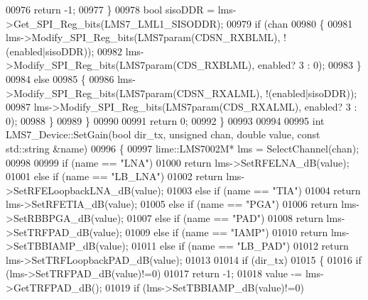 \begin{DoxyCode}
{{{00976                 \textcolor{keywordflow}{return} -1;
00977         \}
00978         \textcolor{keywordtype}{bool} sisoDDR = lms->Get_SPI_Reg_bits(LMS7_LML1_SISODDR);
00979         \textcolor{keywordflow}{if} (chan%
00980         \{
00981             lms->Modify_SPI_Reg_bits(LMS7param(CDSN_RXBLML), !(enabled|sisoDDR));
00982             lms->Modify_SPI_Reg_bits(LMS7param(CDS_RXBLML), enabled? 3 : 0);
00983         \}
00984         \textcolor{keywordflow}{else}
00985         \{
00986             lms->Modify_SPI_Reg_bits(LMS7param(CDSN_RXALML), !(enabled|sisoDDR));
00987             lms->Modify_SPI_Reg_bits(LMS7param(CDS_RXALML),  enabled? 3 : 0);
00988         \}
00989     \}
00990 
00991    \textcolor{keywordflow}{return} 0;
00992 \}
00993 
00994 
00995 \textcolor{keywordtype}{int} LMS7_Device::SetGain(\textcolor{keywordtype}{bool} dir_tx, \textcolor{keywordtype}{unsigned} chan, \textcolor{keywordtype}{double} value, \textcolor{keyword}{const} 
      std::string &name)
00996 \{
00997     lime::LMS7002M* lms = SelectChannel(chan);
00998 
00999     \textcolor{keywordflow}{if} (name == \textcolor{stringliteral}{"LNA"})
01000         \textcolor{keywordflow}{return} lms->SetRFELNA_dB(value);
01001     \textcolor{keywordflow}{else} \textcolor{keywordflow}{if} (name == \textcolor{stringliteral}{"LB\_LNA"})
01002         \textcolor{keywordflow}{return} lms->SetRFELoopbackLNA_dB(value);
01003     \textcolor{keywordflow}{else} \textcolor{keywordflow}{if} (name == \textcolor{stringliteral}{"TIA"})
01004         \textcolor{keywordflow}{return} lms->SetRFETIA_dB(value);
01005     \textcolor{keywordflow}{else} \textcolor{keywordflow}{if} (name == \textcolor{stringliteral}{"PGA"})
01006         \textcolor{keywordflow}{return} lms->SetRBBPGA_dB(value);
01007     \textcolor{keywordflow}{else} \textcolor{keywordflow}{if} (name == \textcolor{stringliteral}{"PAD"})
01008         \textcolor{keywordflow}{return} lms->SetTRFPAD_dB(value);
01009     \textcolor{keywordflow}{else} \textcolor{keywordflow}{if} (name == \textcolor{stringliteral}{"IAMP"})
01010         \textcolor{keywordflow}{return} lms->SetTBBIAMP_dB(value);
01011     \textcolor{keywordflow}{else} \textcolor{keywordflow}{if} (name == \textcolor{stringliteral}{"LB\_PAD"})
01012         \textcolor{keywordflow}{return} lms->SetTRFLoopbackPAD_dB(value);
01013 
01014     \textcolor{keywordflow}{if} (dir\_tx)
01015     \{
01016         \textcolor{keywordflow}{if} (lms->SetTRFPAD_dB(value)!=0)
01017             \textcolor{keywordflow}{return} -1;
01018         value -= lms->GetTRFPAD_dB();
01019         \textcolor{keywordflow}{if} (lms->SetTBBIAMP_dB(value)!=0)
}}}
\end{DoxyCode}
